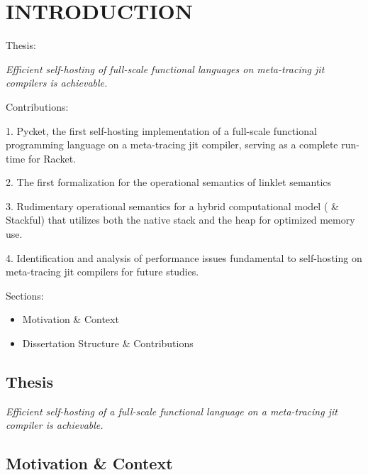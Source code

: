 \chapter[\texorpdfstring{INTRODUCTION}
                          {1. Introduction}]{INTRODUCTION}
    \label{chapter:introduction}

    \begin{chaptersynopsis}
        \footnotesize

       Thesis:

        \textit{Efficient self-hosting of full-scale functional languages on meta-tracing \gls{jit} compilers is achievable.}

        \vspace{2em}

        Contributions:

        1. Pycket, the first self-hosting implementation of a full-scale functional programming language on a meta-tracing \gls{jit} compiler, serving as a complete run-time for Racket.

        2. The first formalization for the operational semantics of linklet semantics

        3. Rudimentary operational semantics for a hybrid computational model ( \& Stackful) that utilizes both the native stack and the heap for optimized memory use.

        4. Identification and analysis of performance issues fundamental to self-hosting on meta-tracing \gls{jit} compilers for future studies.

        \vspace{2em}

        Sections:
		\begin{itemize}
			\item Motivation \& Context
			\item Dissertation Structure \& Contributions
		\end{itemize}
    \end{chaptersynopsis}

    \section{Thesis}

    \textit{Efficient self-hosting of a full-scale functional language on a meta-tracing \gls{jit} compiler is achievable.}


    \section[\texorpdfstring{Motivation \& Context}{Context}]{Motivation \& Context}

